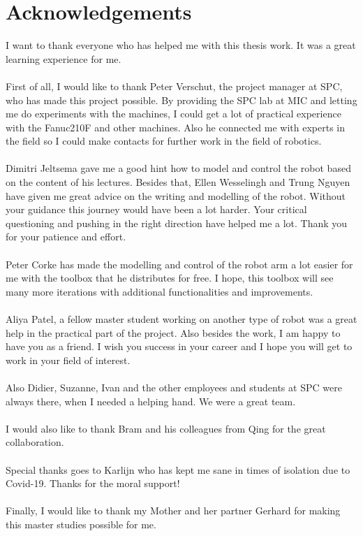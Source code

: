 \chapter*{Acknowledgements}

I want to thank everyone who has helped me with this thesis work. It was a great learning experience for me.\\
\\
First of all, I would like to thank Peter Verschut, the project manager at SPC, who has made this project possible. By providing the SPC lab at MIC and letting me do experiments with the machines, I could get a lot of practical experience with the Fanuc210F and other machines. Also he connected me with experts in the field so I could make contacts for further work in the field of robotics. \\
\\
Dimitri Jeltsema gave me a good hint how to model and control the robot based on the content of his lectures. Besides that, Ellen Wesselingh and Trung Nguyen have given me great advice on the writing and modelling of the robot. Without your guidance this journey would have been a lot harder. Your critical questioning and pushing in the right direction have helped me a lot. Thank you for your patience and effort. \\
\\
Peter Corke has made the modelling and control of the robot arm a lot easier for me with the toolbox that he distributes for free. I hope, this toolbox will see many more iterations with additional functionalities and improvements.\\
\\
Aliya Patel, a fellow master student working on another type of robot was a great help in the practical part of the project. Also besides the work, I am happy to have you as a friend. I wish you success in your career and I hope you will get to work in your field of interest.\\
\\
Also Didier, Suzanne, Ivan and the other employees and students at SPC were always there, when I needed a helping hand. We were a great team.\\
\\
I would also like to thank Bram and his colleagues from Qing for the great collaboration.\\
\\
Special thanks goes to Karlijn who has kept me sane in times of isolation due to Covid-19. Thanks for the moral support!\\
\\
Finally, I would like to thank my Mother and her partner Gerhard for making this master studies possible for me.
